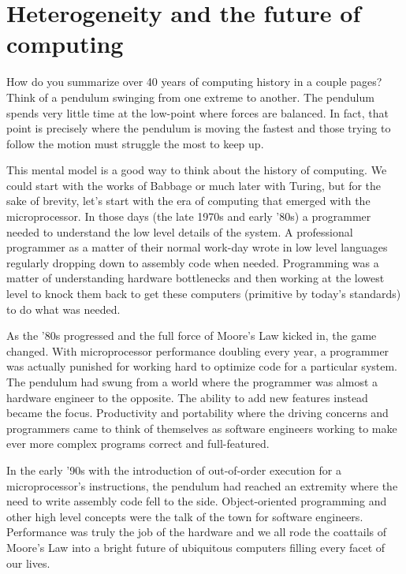 
\def\ArtDir{01.HeteroComp/figures}%

\chapter{Heterogeneity and the future of computing}
\label{chapter:heterogeneity}

How do you summarize over 40 years of computing history in a couple pages?   
Think of a pendulum swinging from one extreme to another.  The pendulum spends very little time at
the low-point where forces are balanced.  In fact, that point is precisely where the pendulum is
moving the fastest and those trying to follow the motion must struggle the most  to keep up.

This mental model is a good way to think about the history of computing.  We could start with the
works of Babbage or much later with Turing, but for the sake of brevity, let's start with the era of computing
that emerged with the microprocessor.  In those days (the late 1970s and early '80s) a programmer
needed to understand the low level details of the system.  A professional programmer as a matter
of their normal work-day wrote in low level languages regularly dropping down to assembly code 
when needed.   Programming was a matter of understanding hardware bottlenecks and then working at the lowest 
level to knock them back to get these computers (primitive by today's standards) to do what was needed.

As the '80s progressed and the full force of Moore's Law kicked in, the game changed.   With
microprocessor performance doubling every year, a programmer was actually punished for 
working hard to optimize code for a particular system.  The pendulum had swung from
a world where the programmer was almost a hardware engineer to the opposite.  The ability to 
add new features instead became the focus.  Productivity and portability where the driving concerns and
programmers came to think of themselves as software engineers working to make ever more
complex programs correct and full-featured.

In the early '90s with the introduction of out-of-order execution for a microprocessor's instructions, the 
pendulum had reached an extremity where the need to write assembly code fell to the side.  Object-oriented
programming and other high level concepts were the talk of the town for software engineers.  Performance was
truly the job of the hardware and we all rode the coattails of Moore's Law into a bright future of
ubiquitous computers filling every facet of our lives.

